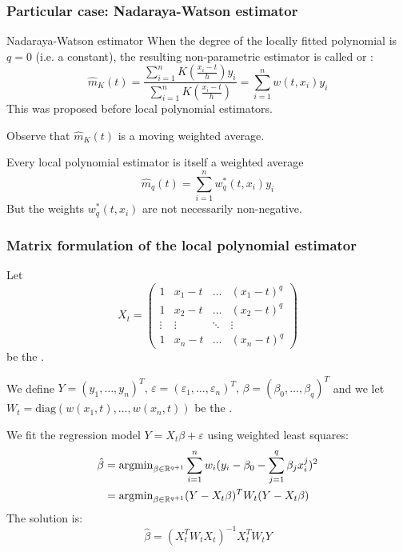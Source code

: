 \subsubsection{Particular case: Nadaraya-Watson estimator}
\begin{definition}{Nadaraya-Watson estimator}{}
	When the degree of the locally fitted polynomial is $q=0$ (i.e. a constant),
	the resulting non-parametric estimator is called 
	or :
	\begin{equation*}
		\hat m_K(t) = \frac{
			\sum_{i=1}^n K \left( \frac{x_i - t}{h} \right) y_i
		}{
			\sum_{i=1}^n K \left( \frac{x_i - t}{h} \right)
		} = \sum_{i=1}^n w(t, x_i) y_i
	\end{equation*}
	\tcblower
	This was proposed before local polynomial estimators.
\end{definition}

Observe that $\hat m_K(t)$ is a moving weighted average.

\begin{prop}{Every local polynomial estimator is itself a weighted average}{}
	\begin{equation*}
		\hat m_{q}(t) = \sum_{i=1}^n w_q^*(t, x_i) y_i
	\end{equation*}
	But the weights $w_q^*(t, x_i)$ are not necessarily non-negative.
\end{prop}

\subsubsection{Matrix formulation of the local polynomial estimator}
Let
\begin{equation*}
	X_t = \begin{pmatrix}
		1      & x_1 - t & \ldots & (x_1 - t)^q \\
		1      & x_2 - t & \ldots & (x_2 - t)^q \\
		\vdots & \vdots  & \ddots & \vdots      \\
		1      & x_n - t & \ldots & (x_n - t)^q
	\end{pmatrix}
\end{equation*}
be the .

We define $Y = (y_1, \ldots, y_n)^T,\, \varepsilon = (\varepsilon_1, \ldots, \varepsilon_n)^T,\,
	\beta = (\beta_0, \ldots, \beta_q)^T$ and we let $W_t = \text{diag}(w(x_1, t), \ldots, w(x_n,t))$
be the .

We fit the regression model $Y = X_t\beta + \varepsilon$ using weighted least squares:
\begin{align*}
	\hat\beta & = \operatorname{argmin}_{\beta\in\mathbb{R}^{q+1}} \sum_{i=1}^n w_i(y_i - \beta_0 - \sum_{j=1}^q \beta_j x_i^j)^2 \\
	          & = \operatorname{argmin}_{\beta\in\mathbb{R}^{q+1}} (Y - X_t\beta)^T W_t (Y - X_t\beta)
\end{align*}
The solution is:
\begin{equation*}
	\hat\beta = (X_t^T W_t X_t)^{-1} X_t^T W_t Y
\end{equation*}

